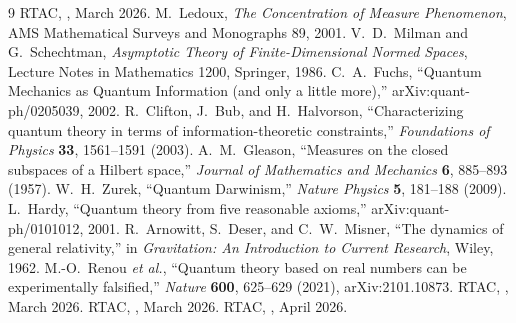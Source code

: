 \documentclass[12pt,a4paper]{article}
\begin{document}
\begin{thebibliography}{9}
 RTAC, , March 2026.
 M.~Ledoux, \emph{The Concentration of Measure Phenomenon}, AMS
Mathematical Surveys and Monographs 89, 2001.
 V.~D.~Milman and G.~Schechtman, \emph{Asymptotic Theory of
Finite-Dimensional Normed Spaces}, Lecture Notes in Mathematics 1200, Springer, 1986.
 C.~A.~Fuchs, ``Quantum Mechanics as Quantum Information (and only a little
more),'' arXiv:quant-ph/0205039, 2002.
 R.~Clifton, J.~Bub, and H.~Halvorson, ``Characterizing quantum theory in
terms of information-theoretic constraints,'' \emph{Foundations of Physics} \textbf{33},
1561--1591 (2003).
 A.~M.~Gleason, ``Measures on the closed subspaces of a Hilbert space,''
\emph{Journal of Mathematics and Mechanics} \textbf{6}, 885--893 (1957).
 W.~H.~Zurek, ``Quantum Darwinism,'' \emph{Nature Physics} \textbf{5},
181--188 (2009).
 L.~Hardy, ``Quantum theory from five reasonable axioms,''
arXiv:quant-ph/0101012, 2001.
 R.~Arnowitt, S.~Deser, and C.~W.~Misner, ``The dynamics of general
relativity,'' in \emph{Gravitation: An Introduction to Current Research}, Wiley, 1962.
 M.-O.~Renou \emph{et al.}, ``Quantum theory based on real
numbers can be experimentally falsified,'' \emph{Nature} \textbf{600}, 625--629
(2021), arXiv:2101.10873.
 RTAC, , March 2026.
 RTAC, , March 2026.
 RTAC, , April 2026.
\end{thebibliography}
\end{document}

